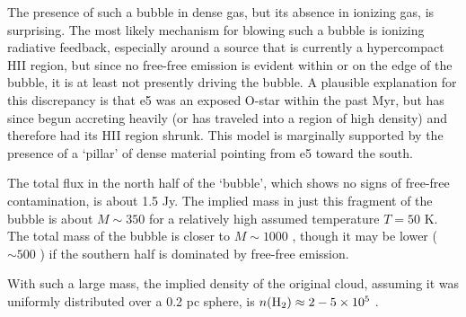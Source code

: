 \documentclass{emulateapj}
\begin{document}
The presence of such a bubble in dense gas, but its absence in ionizing gas, is
surprising.  The most likely mechanism for blowing such a bubble is ionizing
radiative feedback, especially around a source that is currently a hypercompact
HII region, but since no free-free emission is evident within or on the edge of
the bubble, it is at least not presently driving the bubble.  A plausible
explanation for this discrepancy is that e5 was an exposed O-star within the
past Myr, but has since begun accreting heavily (or has traveled into a region
of high density) and therefore had its HII
region shrunk.  This model is marginally supported by the presence of a `pillar'
of dense material pointing from e5 toward the south.

The total flux in the north half of the `bubble', which shows no signs of
free-free contamination, is about 1.5 Jy.  The implied mass in just this
fragment of the bubble is about $M\sim350$ \msun for a relatively high assumed
temperature $T=50$ K.  The total mass of the bubble is closer to $M\sim1000$
\msun, though it may be lower ($\sim500$ \msun) if the southern half is
dominated by free-free emission.

With such a large mass, the implied density of the original cloud, assuming it
was uniformly distributed over a 0.2 pc sphere, is $n(\textrm{H}_{2}) \approx 2-5\times10^{5}$
\percc.
\end{document}

